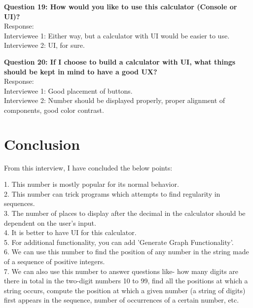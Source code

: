 \documentclass[paper=a4, fontsize=11pt]{report}
\numberwithin{equation}{section}		%
\numberwithin{figure}{section}			%
\numberwithin{table}{section}				%
\begin{document}
\begin{flushleft}
\setlength{\parskip}{\baselineskip}
\textbf{Question 19: How would you like to use this calculator (Console or UI)?}
\\Response:
\\Interviewee 1: Either way, but a calculator with UI would be easier to use.
\\Interviewee 2: UI, for sure.
\\\hrulefill
\end{flushleft}

\begin{flushleft}
\setlength{\parskip}{\baselineskip}
\textbf{Question 20: If I choose to build a calculator with UI, what things should be kept in mind to have a good UX?}
\\Response:
\\Interviewee 1: Good placement of buttons.
\\Interviewee 2: Number should be displayed properly, proper alignment of components, good color contrast.
\\\hrulefill
\end{flushleft}

\section{Conclusion}
\begin{flushleft}
From this interview, I have concluded the below points:

1. This number is mostly popular for its normal behavior.
\\2. This number can trick programs which attempts to find regularity in sequences.
\\3. The number of places to display after the decimal in the calculator should be dependent on the user's input.
\\4. It is better to have UI for this calculator.
\\5. For additional functionality, you can add 'Generate Graph Functionality'.
\\6. We can use this number to find the position of any number in the string made of a sequence of positive integers.
\\7. We can also use this number to answer questions like- how many digits are there in total in the two-digit numbers 10 to 99, find all the positions at which a string occurs, compute the position at which a given number (a string of digits) first appears in the sequence, number of occurrences of a certain number, etc.

\end{flushleft}
\end{document}
